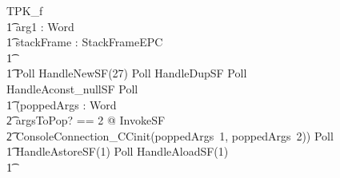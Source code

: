\begin{figure}[tp!]
  \centering
  \setlength{\zedtab}{0.4cm}
  \setlength{\zedindent}{0pt}
  \setlength{\zedleftsep}{0pt}
  \setlength{\abovedisplayskip}{0pt}
  \setlength{\belowdisplayskip}{0pt}
  \setlength{\abovedisplayshortskip}{0pt}
  \setlength{\belowdisplayshortskip}{0pt}
  \begin{circusaction}
    TPK\_f \circdef \\
    \t1 \circval arg1 : Word \circspot \\
    \t1 \circvar stackFrame : StackFrameEPC \circspot \\
    \t1 \lschexpract [arg1? : Word; stackFrame' : StackFrameEPC | \\
    \t2 \langle arg1? \rangle \subseteq stackFrame'.localVariables \land \\
    \t2 \# stackFrame'.localVariables = 6 \land \\
    \t2 stackFrame'.operandStack = \langle\rangle \land \\
    \t2 stackFrame'.frameClass = TPK \land \\
    \t2 stackFrame'.stackSize = 3] \rschexpract \circseq \\
    \t1 Poll \circseq HandleNewSF(27) \circseq Poll \circseq HandleDupSF \circseq Poll \circseq  HandleAconst\_nullSF \circseq Poll \circseq \\
    \t1 (\circvar poppedArgs : \seq Word \circspot \\
    \t2 \lschexpract \exists argsToPop? == 2 @ InvokeSF \rschexpract \circseq \\
    \t2 ConsoleConnection\_CCinit(poppedArgs~1, poppedArgs~2)) \circseq Poll \circseq \\
    \t1 HandleAstoreSF(1) \circseq Poll \circseq HandleAloadSF(1) \circseq \\
    \t1 {} \cdots {} \\

\end{circusaction}
\end{figure}
